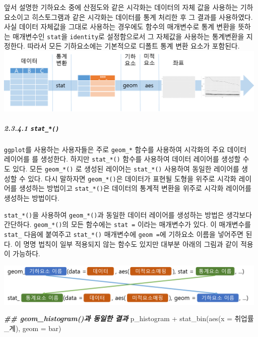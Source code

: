 \documentclass[
]{article}
\newenvironment{Shaded}{\begin{snugshade}}{\end{snugshade}}
\newcommand{\AttributeTok}[1]{\textcolor[rgb]{0.77,0.63,0.00}{#1}}
\newcommand{\DocumentationTok}[1]{\textcolor[rgb]{0.56,0.35,0.01}{\textbf{\textit{#1}}}}
\newcommand{\FunctionTok}[1]{\textcolor[rgb]{0.00,0.00,0.00}{#1}}
\newcommand{\NormalTok}[1]{#1}
\newcommand{\SpecialCharTok}[1]{\textcolor[rgb]{0.00,0.00,0.00}{#1}}
\newcommand{\StringTok}[1]{\textcolor[rgb]{0.31,0.60,0.02}{#1}}
\begin{document}
앞서 설명한 기하요소 중에 산점도와 같은 시각화는 데이터의 자체 값을 사용하는 기하요소이고 히스토그램과 같은 시각화는 데이터를 통계 처리한 후 그 결과를 사용하였다. 사실 데이터 자체값을 그대로 사용하는 경우에도 함수의 매개변수로 통계 변환을 뜻하는 매개변수인 \texttt{stat}을 \texttt{identity}로 설정함으로서 그 자체값을 사용하는 통계변환을 지정한다. 따라서 모든 기하요소에는 기본적으로 디폴트 통계 변환 요소가 포함된다.\\
\includegraphics{stat.png}

\hypertarget{stat_}{%
\subparagraph{\texorpdfstring{2.3.4.1 \texttt{stat\_*()}}{2.3.4.1 stat\_*()}}\label{stat_}}

\texttt{ggplot}를 사용하는 사용자들은 주로 \texttt{geom\_*} 함수를 사용하여 시각화의 주요 데이터 레이어를 를 생성한다. 하지만 \texttt{stat\_*()} 함수를 사용하여 데이터 레이어를 생성할 수도 있다. 모든 \texttt{geom\_*()} 로 생성된 레이어는 \texttt{stat\_*()} 사용하여 동일한 레이어를 생성할 수 있다. 다시 말하자면 \texttt{geom\_*()}은 데이터가 표현될 도형을 위주로 시각화 레이어를 생성하는 방법이고 \texttt{stat\_*()}은 데이터의 통계적 변환을 위주로 시각화 레이어를 생성하는 방법이다.

\texttt{stat\_*()}을 사용하여 \texttt{geom\_*()}과 동일한 데이터 레이어를 생성하는 방법은 생각보다 간단하다. \texttt{geom\_*()}의 모든 함수에는 \texttt{stat\ =} 이라는 매개변수가 있다. 이 매개변수를 \texttt{stat\_} 다음에 붙여주고 \texttt{stat\_*()} 매개변수에 \texttt{geom\ =}에 기하요소 이름을 넣어주면 된다. 이 명명 법칙이 일부 적용되지 않는 함수도 있지만 대부분 아래의 그림과 같이 적용이 가능하다.

\includegraphics{stat1.png}

\begin{Shaded}
\begin{Highlighting}[]
\DocumentationTok{\#\# geom\_histogram()과 동일한 결과}
\NormalTok{p\_histogram }\SpecialCharTok{+} \FunctionTok{stat\_bin}\NormalTok{(}\FunctionTok{aes}\NormalTok{(}\AttributeTok{x =}\NormalTok{ 취업률\_계), }\AttributeTok{geom =} \StringTok{\textquotesingle{}bar\textquotesingle{}}\NormalTok{)}
\end{Highlighting}
\end{Shaded}
\end{document}
